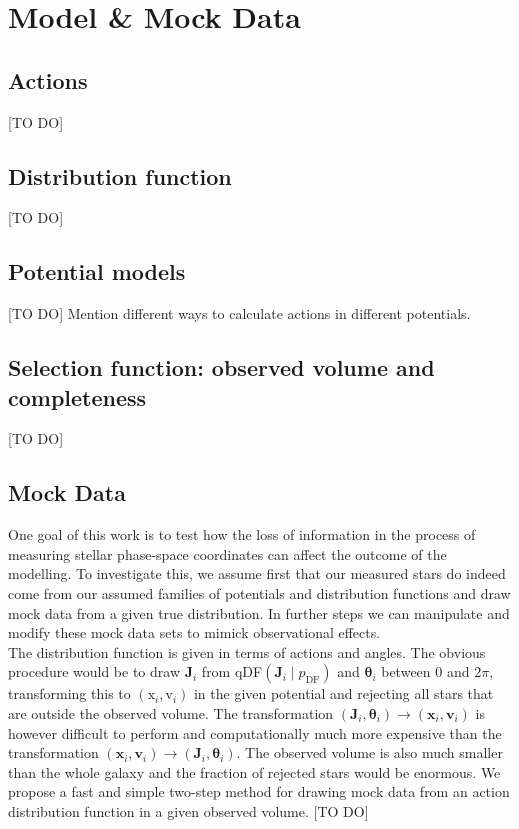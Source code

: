 \documentclass[12pt,preprint]{aastex}
\newcommand{\vect}[1]{\boldsymbol{#1}} %
\begin{document}
\section{Model \& Mock Data}

\subsection{Actions}

[TO DO]


\subsection{Distribution function} \label{sec:qDF}

[TO DO]

\subsection{Potential models}  \label{sec:potentials}

[TO DO] Mention different ways to calculate actions in different potentials.

\subsection{Selection function: observed volume and completeness}

[TO DO]

\subsection{Mock Data}

One goal of this work is to test how the loss of information in the process of measuring stellar phase-space coordinates can affect the outcome of the modelling. To investigate this, we assume first that our measured stars do indeed come from our assumed families of potentials and distribution functions and draw mock data from a given true distribution. In further steps we can manipulate and modify these mock data sets to mimick observational effects.\\
The distribution function is given in terms of actions and angles. The obvious procedure would be to draw $\vect{J}_i$ from qDF$(\vect{J}_i \mid p_\text{DF})$ and $\vect{\theta}_i$ between 0 and $2\pi$, transforming this to $(\text{x}_i,\text{v}_i)$ in the given potential and rejecting all stars that are outside the observed volume. The transformation $(\vect{J}_i,\vect{\theta}_i) \longrightarrow (\vect{x}_i,\vect{v}_i)$ is however difficult to perform and computationally much more expensive than the transformation $(\vect{x}_i,\vect{v}_i) \longrightarrow (\vect{J}_i,\vect{\theta}_i)$. The observed volume is also much smaller than the whole galaxy and the fraction of rejected stars would be enormous. We propose a fast and simple two-step method for drawing mock data from an action distribution function in a given observed volume.
[TO DO]
\end{document}
